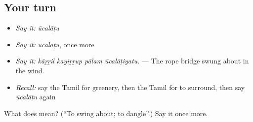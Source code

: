\subsection*{Your turn}
\begin{itemize}
\raggedright
  \item \emph{Say it:} \emph{ūcalāṭu}
  \item \emph{Say it:} \emph{ūcalāṭu}, once more
  \item \emph{Say it:} \emph{kāṟṟil kayiṟṟup pālam ūcalāṭiyatu.} — The rope bridge swung about in the wind.
  \item \emph{Recall:} say the Tamil for greenery, then the Tamil for to surround, then say \emph{ūcalāṭu} again
\end{itemize}

\begin{tcolorbox}[breakable,colback=teal!4,colframe=teal!35!black,title={Before you move on}]
What does  mean? (\textquotedblleft{}To swing about; to dangle\textquotedblright{}.) Say it once more.
\end{tcolorbox}
